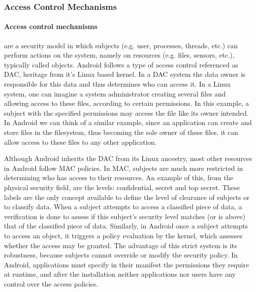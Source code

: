 
\subsubsection{Access Control Mechanisms}


\paragraph{\textbf{Access control mechanisms}} are a security model in which subjects (e.g. user, processes, threads, etc.) can perform actions on the system, namely on resources (e.g. files, sensors, etc.), typically called objects. Android follows a type of access control referenced as \ac{DAC}, heritage from it's Linux based kernel. In a \ac{DAC} system the data owner is responsible for this data and thus determines who can access it. In a Linux system, one can imagine a system administrator creating several files and allowing access to these files, according to certain permissions. In this example, a subject with the specified permissions may access the file like its owner intended. In Android we can think of a similar example, since an application can create and store files in the filesystem, thus becoming the sole owner of these files, it can allow access to these files to any other application.

Although Android inherits the \ac{DAC} from its Linux ancestry, most other resources in Android follow \ac{MAC} policies. In \ac{MAC}, subjects are much more restricted in determining who has access to their resources. An example of this, from the physical security field, are the levels: confidential, secret and top secret. These labels are the only concept available to define the level of clearance of subjects or to classify data. When a subject attempts to access a classified piece of data, a verification is done to assess if this subject's security level matches (or is above) that of the classified piece of data. Similarly, in Android once a subject attempts to access an object, it triggers a policy evaluation by the kernel, which assesses whether the access may be granted. The advantage of this strict system is its robustness, because subjects cannot override or modify the security policy. In Android, applications must specify in their manifest the permissions they require at runtime, and after the installation neither applications nor users have any control over the access policies.

